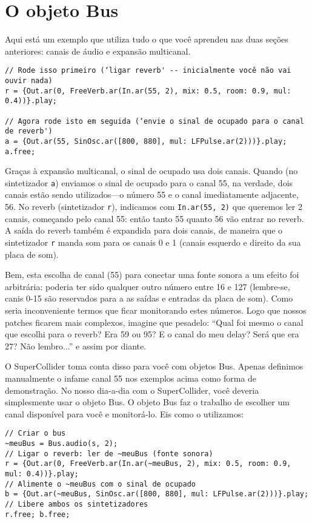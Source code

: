 \section{O objeto Bus}
\label{sec:busobject}

Aqui está um exemplo que utiliza tudo o que você aprendeu nas duas seções anteriores: canais de áudio e expansão multicanal.
 
\begin{lstlisting}[style=SuperCollider-IDE, basicstyle=\scttfamily\footnotesize]
// Rode isso primeiro (‘ligar reverb' -- inicialmente você não vai ouvir nada)
r = {Out.ar(0, FreeVerb.ar(In.ar(55, 2), mix: 0.5, room: 0.9, mul: 0.4))}.play;

// Agora rode isto em seguida (‘envie o sinal de ocupado para o canal de reverb')
a = {Out.ar(55, SinOsc.ar([800, 880], mul: LFPulse.ar(2)))}.play;
a.free;
\end{lstlisting}
 

Graças à expansão multicanal, o sinal de ocupado usa dois canais. Quando (no sintetizador \texttt{a}) enviamos o sinal de ocupado para o canal 55, na verdade, dois canais estão sendo utilizados---o número 55 e o canal imediatamente adjacente, 56. No reverb (sintetizador \texttt{r}), indicamos com \texttt{In.ar(55, 2)} que queremos ler 2 canais, começando pelo canal 55: então tanto 55 quanto 56 vão entrar no reverb. A saída do reverb também é expandida para dois canais, de maneira que o sintetizador \texttt{r} manda som para os canais 0 e 1 (canais esquerdo e direito da sua placa de som).

Bem, esta escolha de canal (55) para conectar uma fonte sonora a um efeito foi arbitrária: poderia ter sido qualquer outro número entre 16 e 127 (lembre-se, canis 0-15 são reservados para a as saídas e entradas da placa de som). Como seria inconveniente termos que ficar monitorando estes números. Logo que nossos patches ficarem mais complexos, imagine que pesadelo: “Qual foi mesmo o canal que escolhi para o reverb? Era 59 ou 95? E o canal do meu delay? Será que era 27? Não lembro...” e assim por diante.

O SuperCollider toma conta disso para você com objetos Bus. Apenas definimos manualmente o infame canal 55 nos exemplos acima como forma de demonstração. No nosso dia-a-dia com o SuperCollider, você deveria simplesmente usar o objeto Bus. O objeto Bus faz o trabalho de escolher um canal disponível para você e monitorá-lo. Eis como o utilizamos:

 
\begin{lstlisting}[style=SuperCollider-IDE, basicstyle=\scttfamily\footnotesize]
// Criar o bus
~meuBus = Bus.audio(s, 2);
// Ligar o reverb: ler de ~meuBus (fonte sonora)
r = {Out.ar(0, FreeVerb.ar(In.ar(~meuBus, 2), mix: 0.5, room: 0.9, mul: 0.4))}.play;
// Alimente o ~meuBus com o sinal de ocupado
b = {Out.ar(~meuBus, SinOsc.ar([800, 880], mul: LFPulse.ar(2)))}.play;
// Libere ambos os sintetizadores
r.free; b.free;
\end{lstlisting}
 

